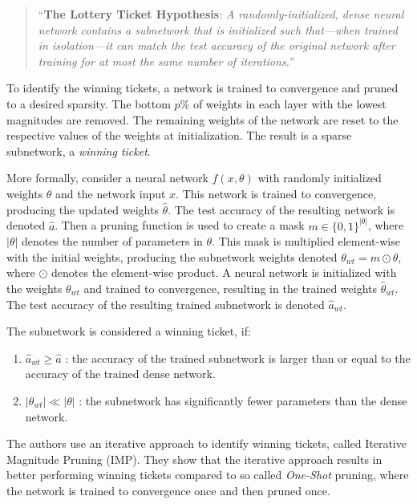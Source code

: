 \begin{quote}
    “\textbf{The Lottery Ticket Hypothesis}: \textit{A randomly-initialized, dense neural network contains a subnetwork that is initialized such that—when trained in isolation—it can match the test accuracy of the original network after training for at most the same number of iterations.}”~\cite{DBLP:conf/iclr/FrankleC19}
\end{quote}

To identify the winning tickets, a network is trained to convergence and pruned to a desired sparsity. 
The bottom $p$\% of weights in each layer with the lowest magnitudes are removed. 
The remaining weights of the network are reset to the respective values of the weights at initialization.
The result is a sparse subnetwork, a \textit{winning ticket}.

More formally, consider a neural network $f(x, \theta)$ with randomly initialized weights $\theta$ and the network input $x$.
This network is trained to convergence, producing the updated weights $\hat \theta$. The test accuracy of the resulting network is denoted $\hat a$.
Then a pruning function is used to create a mask $m \in \{0,1\}^{|\theta|}$, where $|\theta|$ denotes the number of parameters in $\theta$.
This mask is multiplied element-wise with the initial weights, producing the subnetwork weights denoted $\theta_{wt} = m \odot \theta$, where $\odot$ denotes the element-wise product.
A neural network is initialized with the weights $\theta_{wt}$ and trained to convergence, resulting in the trained weights $\hat \theta_{wt}$. 
The test accuracy of the resulting trained subnetwork is denoted $\hat a_{wt}$.

The subnetwork is considered a winning ticket, if:
\begin{enumerate}
  \item  $\hat a_{wt} \geq \hat a$ :  the accuracy of the trained subnetwork is larger than or equal to the accuracy of the  trained dense network.
  \item $|\theta_{wt}| \ll |\theta|$ : the subnetwork has significantly fewer parameters than the dense network.
\end{enumerate}

The authors use an iterative approach to identify winning tickets, called Iterative Magnitude Pruning (IMP).
They show that the iterative approach results in better performing winning tickets compared to so called \textit{One-Shot} pruning, where the network is trained to convergence once and then pruned once.

